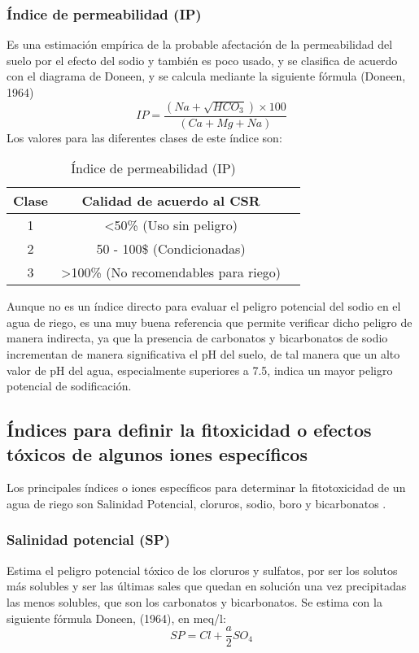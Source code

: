 \subsubsection{Índice de permeabilidad (IP)}
Es una estimación empírica de la probable afectación de la permeabilidad del suelo por el efecto del sodio y también es poco usado, y se clasifica de acuerdo con el diagrama de Doneen, y se calcula mediante la siguiente fórmula (Doneen, 1964)
\begin{equation}
  IP = \frac{\left(Na + \sqrt{HCO_3}\right) \times 100}{\left(Ca + Mg + Na\right)}
\end{equation}
Los valores para las diferentes clases de este índice son:
\begin{table}[h!]
  \centering
  \begin{tabular}{@{}ccc@{}}
  \toprule
  Clase & Calidad de acuerdo al CSR                        &  \\ \midrule
  1     & \textless 50\% (Uso sin peligro)                 &  \\
  2     & 50 - 100\$ (Condicionadas)                       &  \\
  3     & \textgreater 100\% (No recomendables para riego) &  \\ \bottomrule
  \end{tabular}
  \caption{Índice de permeabilidad (IP)}
  \label{tabsa12}
  \end{table}
Aunque no es un índice directo para evaluar el peligro potencial del sodio en el agua de riego, es una muy buena referencia que permite verificar dicho peligro de manera indirecta, ya que la presencia de carbonatos y bicarbonatos de sodio incrementan de manera significativa el pH del suelo, de tal manera que un alto valor de pH del agua, especialmente superiores a 7.5, indica un mayor peligro potencial de sodificación.
\subsection{Índices para definir la fitoxicidad o efectos tóxicos de algunos iones específicos}
Los principales índices o iones específicos para determinar la fitotoxicidad de un
agua de riego son Salinidad Potencial, cloruros, sodio, boro y bicarbonatos .
\subsubsection{Salinidad potencial (SP)}
Estima el peligro potencial tóxico de los cloruros y sulfatos, por ser los solutos más solubles y ser las últimas sales que quedan en solución una vez precipitadas las menos solubles, que son los carbonatos y bicarbonatos. Se estima con la siguiente fórmula Doneen, (1964), en meq/l:
\begin{equation}
  SP = Cl + \frac{a}{2}SO_4 
\end{equation}
